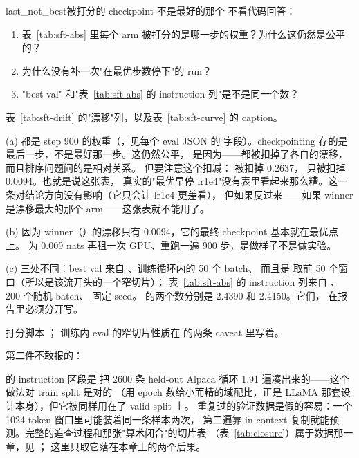 \begin{checkpoint}{last_not_best}{被打分的 checkpoint 不是最好的那个}
不看代码回答：
\begin{enumerate}[label=(\alph*)]
  \item 表~\ref{tab:sft-abs} 里每个 arm 被打分的是哪一步的权重？为什么这仍然是公平的？
  \item 为什么没有补一次"在最优步数停下"的 run？
  \item "best val" 和"表~\ref{tab:sft-abs} 的 instruction 列"是不是同一个数？
\end{enumerate}
\hint 表~\ref{tab:sft-drift} 的"漂移"列，以及表~\ref{tab:sft-curve} 的 caption。

\ifshowanswers
\tcblower
\answer (a) 都是 step 900 的权重（，见每个 eval JSON 的
 字段）。checkpointing 存的是最后一步，不是最好那一步。这仍然公平，
是因为——都被扣掉了各自的漂移，而且排序问题问的是相对关系。
但要注意这个扣减： 被扣掉 0.2637，
 只被扣掉 0.0094。也就是说这张表，
真实的"最优早停 lr1e4"没有表里看起来那么糟。这一条对结论方向没有影响（它只会让 lr1e4 更差看），
但如果反过来——如果 winner 是漂移最大的那个 arm——这张表就不能用了。

(b) 因为 winner（）的漂移只有 $0.0094$，它的最终 checkpoint 基本就在最优点上。
为 0.009 nats 再租一次 GPU、重跑一遍 900 步，是做样子不是做实验。

(c)  三处不同：best val 来自 、训练循环内的 50 个 batch、
而且是  取前 50 个窗口（所以是该流开头的一个窄切片）；
表~\ref{tab:sft-abs} 的 instruction 列来自 、200 个随机 batch、
固定 seed。 的两个数分别是 2.4390 和 2.4150。它们，
在报告里必须分开写。

\whereincode 打分脚本 ；
训练内 eval 的窄切片性质在  的两条 caveat 里写着。
\fi
\end{checkpoint}

第二件不敢报的：

 的 instruction 区段是 
把 2600 条 held-out Alpaca 循环 1.91 遍凑出来的——这个做法对 train split 是对的
（用 epoch 数给小而精的域配比，正是 LLaMA 那套设计本身），但它被同样用在了 valid split 上。
重复过的验证数据是假的容易：一个 1024-token 窗口里可能装着同一条样本两次，
第二遍靠 in-context 复制就能预测。完整的追查过程和那张"算术闭合"的切片表
（表~\ref{tab:closure}）属于数据那一章，见 ；
这里只取它落在本章上的两个后果。

